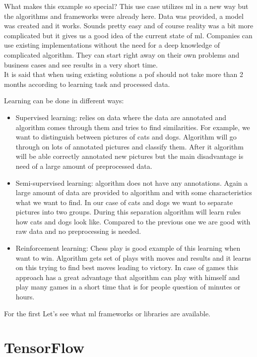 \documentclass[thesis=M,english]{FITthesis}[2012/06/26]
\begin{document}
What makes this example so special? This use case utilizes  \acrshort{ml} in a new way but the algorithms and frameworks were already here. Data was provided, a model was created and it works. Sounds pretty easy and of course reality was a bit more complicated but it gives us a good idea of the current state of \acrshort{ml}. Companies can use existing implementations without the need for a deep knowledge of complicated algorithm. They can start right away on their own problems and business cases and see results in a very short time.\\

It is said that when using existing solutions a \acrshort{pof} should not take more than 2 months according to learning task and processed data.

Learning can be done in different ways: 
\begin{itemize}[nosep]
\item Supervised learning: relies on data where the data are annotated and algorithm comes through them and tries to find similarities. For example, we want to distinguish between pictures of cats and dogs. Algorithm will go through on lots of annotated pictures and classify them. After it algorithm will be able correctly annotated new pictures but the main disadvantage is need of a large amount of preprocessed data. 
\item Semi-supervised learning: algorithm does not have any annotations. Again a large amount of data are provided to algorithm and with some characteristics what we want to find. In our case of cats and dogs we want to separate pictures into two groups. During this separation algorithm will learn rules how cats and dogs look like. Compared to the previous one we are good with raw data and no preprocessing is needed.
\item Reinforcement learning: Chess play is good example of this learning when want to win. Algorithm gets set of plays with moves and results and it learns on this trying to find best moves leading to victory. In case of games this approach has a great advantage that algorithm can play with himself and play many games in a short time that is for people question of minutes or hours.
\end{itemize}


For the first Let's see what \acrshort{ml} frameworks or libraries are available.

\section{TensorFlow}
\end{document}
